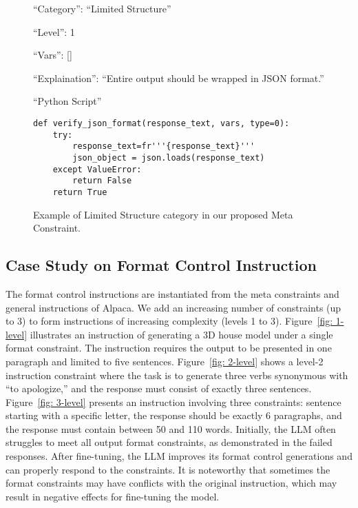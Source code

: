 \begin{figure*}[t!]
\centering
\begin{tcolorbox}[colback=gray!00,%
                  colframe=black,%
                  width=16cm,%
                  arc=1.5mm, auto outer arc,
                  left=0.9mm, right=0.9mm,
                  boxrule=0.9pt, colbacktitle = black!65!black
                 ]

 ``Category'': ``Limited Structure''

 ``Level'': 1

 ``Vars'': []

 ``Explaination'': ``Entire output should be wrapped in JSON format.''

 ``Python Script''
\begin{verbatim}
def verify_json_format(response_text, vars, type=0):
    try:
        response_text=fr'''{response_text}'''
        json_object = json.loads(response_text)
    except ValueError:
        return False
    return True
\end{verbatim}


\end{tcolorbox}
\caption{Example of Limited Structure category in our proposed Meta Constraint.}
\label{fig: example2}
\end{figure*}



\subsection{Case Study on Format Control Instruction}
The format control instructions are instantiated from the meta constraints and general instructions of Alpaca. We add an increasing number of constraints (up to 3) to form instructions of increasing complexity (levels 1 to 3). 
Figure~\ref{fig: 1-level} illustrates an instruction of generating a 3D house model under a single format constraint. The instruction requires the output to be presented in one paragraph and limited to five sentences.
Figure~\ref{fig: 2-level} shows a level-2 instruction constraint where the task is to generate three verbs synonymous with ``to apologize,'' and the response must consist of exactly three sentences. 
Figure~\ref{fig: 3-level} presents an instruction involving three constraints: sentence starting with a specific letter, the response should be exactly 6 paragraphs, and the response must contain between 50 and 110 words. 
Initially, the LLM often struggles to meet all output format constraints, as demonstrated in the failed responses. After fine-tuning, the LLM improves its format control generations and can properly respond to the constraints. 
It is noteworthy that sometimes the format constraints may have conflicts with the original instruction, which may result in negative effects for fine-tuning the model.

